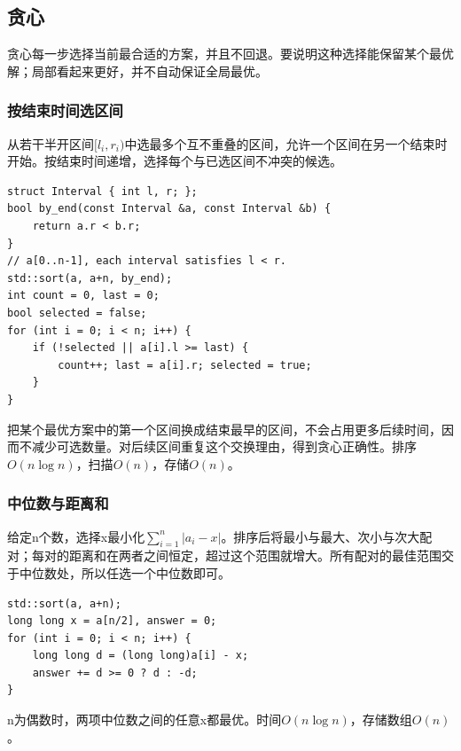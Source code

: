 \documentclass[UTF8,11pt,a4paper,fontset=none]{ctexart}
\begin{document}
\subsection{贪心}
贪心每一步选择当前最合适的方案，并且不回退。要说明这种选择能保留某个最优解；局部看起来更好，并不自动保证全局最优。
\subsubsection{按结束时间选区间}
从若干半开区间$[l_i,r_i)$中选最多个互不重叠的区间，允许一个区间在另一个结束时开始。按结束时间递增，选择每个与已选区间不冲突的候选。
\par\noindent\begin{minipage}{\linewidth}
\begin{lstlisting}
struct Interval { int l, r; };
bool by_end(const Interval &a, const Interval &b) {
    return a.r < b.r;
}
// a[0..n-1], each interval satisfies l < r.
std::sort(a, a+n, by_end);
int count = 0, last = 0;
bool selected = false;
for (int i = 0; i < n; i++) {
    if (!selected || a[i].l >= last) {
        count++; last = a[i].r; selected = true;
    }
}
\end{lstlisting}
\end{minipage}\par
把某个最优方案中的第一个区间换成结束最早的区间，不会占用更多后续时间，因而不减少可选数量。对后续区间重复这个交换理由，得到贪心正确性。排序$O(n\log n)$，扫描$O(n)$，存储$O(n)$。
\subsubsection{中位数与距离和}
给定n个数，选择x最小化$\sum_{i=1}^n|a_i-x|$。排序后将最小与最大、次小与次大配对；每对的距离和在两者之间恒定，超过这个范围就增大。所有配对的最佳范围交于中位数处，所以任选一个中位数即可。
\par\noindent\begin{minipage}{\linewidth}
\begin{lstlisting}
std::sort(a, a+n);
long long x = a[n/2], answer = 0;
for (int i = 0; i < n; i++) {
    long long d = (long long)a[i] - x;
    answer += d >= 0 ? d : -d;
}
\end{lstlisting}
\end{minipage}\par
n为偶数时，两项中位数之间的任意x都最优。时间$O(n\log n)$，存储数组$O(n)$。
\end{document}
